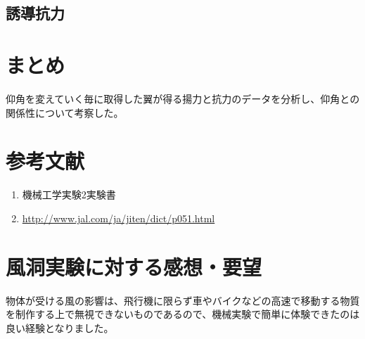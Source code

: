 \documentclass[a4j,twoside,openright,11pt]{jarticle}
\begin{document}
\subsection{誘導抗力}


\section{まとめ}
仰角を変えていく毎に取得した翼が得る揚力と抗力のデータを分析し、仰角との関係性について考察した。

\section{参考文献}
\begin{enumerate}
\item 機械工学実験2実験書
\item \url{http://www.jal.com/ja/jiten/dict/p051.html}
\end{enumerate}

\section{風洞実験に対する感想・要望}
物体が受ける風の影響は、飛行機に限らず車やバイクなどの高速で移動する物質を制作する上で無視できないものであるので、機械実験で簡単に体験できたのは良い経験となりました。
\end{document}
